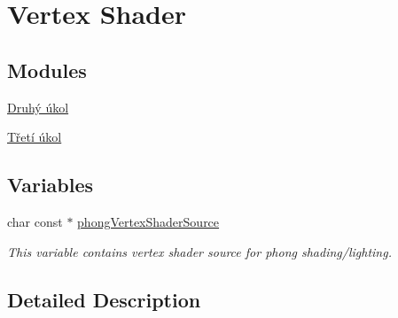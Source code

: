 \hypertarget{group__vs}{\section{Vertex Shader}
\label{group__vs}
}
\subsection*{Modules}
\begin{DoxyCompactItemize}
\item 
\hyperlink{group__task2}{Druhý úkol}
\item 
\hyperlink{group__task3}{Třetí úkol}
\end{DoxyCompactItemize}
\subsection*{Variables}
\begin{DoxyCompactItemize}
\item 
char const $\ast$ \hyperlink{group__vs_gad2d377f5d5db8945bf16b9e9ca1b71a5}{phong\-Vertex\-Shader\-Source}
\begin{DoxyCompactList}\small\item\em This variable contains vertex shader source for phong shading/lighting. \end{DoxyCompactList}\end{DoxyCompactItemize}


\subsection{Detailed Description}


